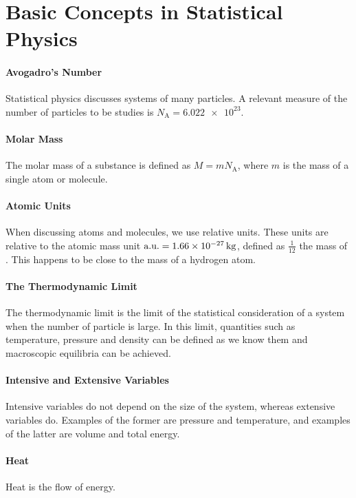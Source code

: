 \section{Basic Concepts in Statistical Physics}

\paragraph{Avogadro's Number}
Statistical physics discusses systems of many particles. A relevant measure of the number of particles to be studies is $N_{\text{A}} = \num{6.022e23}$.

\paragraph{Molar Mass}
The molar mass of a substance is defined as $M = mN_{\text{A}}$, where $m$ is the mass of a single atom or molecule.

\paragraph{Atomic Units}
When discussing atoms and molecules, we use relative units. These units are relative to the atomic mass unit $\text{a.u.} = \SI{1.66e-27}{\kilo\gram}$, defined as $\frac{1}{12}$ the mass of . This happens to be close to the mass of a hydrogen atom.

\paragraph{The Thermodynamic Limit}
The thermodynamic limit is the limit of the statistical consideration of a system when the number of particle is large. In this limit, quantities such as temperature, pressure and density can be defined as we know them and macroscopic equilibria can be achieved.

\paragraph{Intensive and Extensive Variables}
Intensive variables do not depend on the size of the system, whereas extensive variables do. Examples of the former are pressure and temperature, and examples of the latter are volume and total energy.

\paragraph{Heat}
Heat is the flow of energy.

